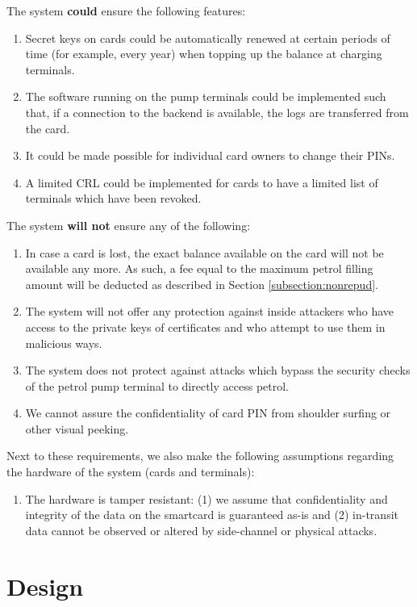 \documentclass[a4paper,10pt]{llncs}
\begin{document}
The system {\bf could} ensure the following features:
\begin{enumerate}
  \item Secret keys on cards could be automatically renewed at certain periods of time (for example, every year) when topping up the balance at charging terminals.
  \item The software running on the pump terminals could be implemented such that, if a connection to the backend is available, the logs are transferred from the card.
  \item It could be made possible for individual card owners to change their PINs.
  \item A limited CRL could be implemented for cards to have a limited list of terminals which have been revoked.
\end{enumerate}

The system {\bf will not} ensure any of the following:
\begin{enumerate}
  \item In case a card is lost, the exact balance available on the card will not be available any more. As such, a fee equal to the maximum petrol filling amount will be deducted as described in Section \ref{subsection:nonrepud}.
  \item The system will not offer any protection against inside attackers who have access to the private keys of certificates and who attempt to use them in malicious ways.
  \item The system does not protect against attacks which bypass the security checks of the petrol pump terminal to directly access petrol.
  \item We cannot assure the confidentiality of card PIN from shoulder surfing or other visual peeking.
\end{enumerate}

Next to these requirements, we also make the following assumptions regarding the hardware of the system (cards and terminals):
\begin{enumerate}
  \item The hardware is tamper resistant: (1) we assume that confidentiality and integrity of the data on the smartcard is guaranteed as-is and (2) in-transit data cannot be observed or altered by side-channel or physical attacks.
\end{enumerate}

\section{Design}
\end{document}
